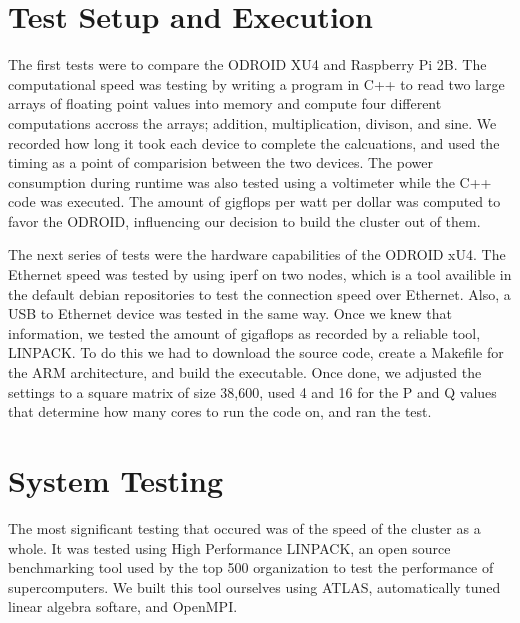 \section{Test Setup and Execution}

The first tests were to compare the ODROID XU4 and Raspberry Pi 2B. The computational speed was testing by writing a program in C++ to read two large arrays of floating point values into memory and compute four different computations accross the arrays; addition, multiplication, divison, and sine. We recorded how long it took each device to complete the calcuations, and used the timing as a point of comparision between the two devices. The power consumption during runtime was also tested using a voltimeter while the C++ code was executed. The amount of gigflops per watt per dollar was computed to favor the ODROID, influencing our decision to build the cluster out of them.

The next series of tests were the hardware capabilities of the ODROID xU4. The Ethernet speed was tested by using iperf on two nodes, which is a tool availible in the default debian repositories to test the connection speed over Ethernet. Also, a USB to Ethernet device was tested in the same way. Once we knew that information, we tested the amount of gigaflops as recorded by a reliable tool, LINPACK. To do this we had to download the source code, create a Makefile for the ARM architecture, and build the executable. Once done, we adjusted the settings to a square matrix of size 38,600, used 4 and 16 for the P and Q values that determine how many cores to run the code on, and ran the test.

\section{System Testing}

The most significant testing that occured was of the speed of the cluster as a whole. It was tested using High Performance LINPACK, an open source benchmarking tool used by the top 500 organization to test the performance of supercomputers. We built this tool ourselves using ATLAS, automatically tuned linear algebra softare, and OpenMPI. 


